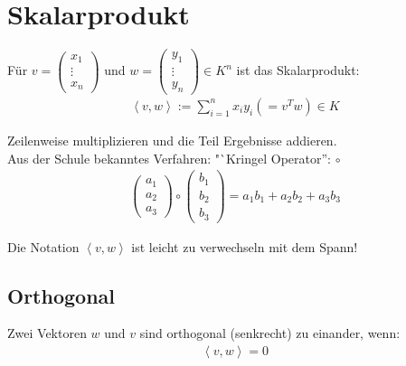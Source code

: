 \documentclass{scrartcl}
\begin{document}
\newpage
\section{Skalarprodukt}

\begin{Def}
    Für $v = \begin{pmatrix} x_1 \\ \vdots \\ x_n \end{pmatrix}$ und $w = \begin{pmatrix} y_1 \\ \vdots \\ y_n \end{pmatrix} \in K^n$ ist das Skalarprodukt:
    \begin{align*}
        \left< v, w \right> := \sum_{i=1}^n x_i y_i (= v^T w) \in K
    \end{align*}
\end{Def}

\begin{Notiz}
    Zeilenweise multiplizieren und die Teil Ergebnisse addieren.\\
    Aus der Schule bekanntes Verfahren: "`Kringel Operator'': $\circ$
    \begin{align*}
        \begin{pmatrix}
            a_1 \\ a_2 \\ a_3
        \end{pmatrix}
        \circ
        \begin{pmatrix}
            b_1 \\ b_2 \\ b_3
        \end{pmatrix} = a_1b_1 + a_2b_2 + a_3b_3
    \end{align*}
\end{Notiz}

\begin{Warnung}
    Die Notation $\left< v,w \right>$ ist leicht zu verwechseln mit dem Spann!
\end{Warnung}

\subsection{Orthogonal}
\begin{Def}
    Zwei Vektoren $w$ und $v$ sind orthogonal (senkrecht) zu einander, wenn:
    \begin{align*}
        \left< v,w \right> = 0
    \end{align*}
\end{Def}
\end{document}
